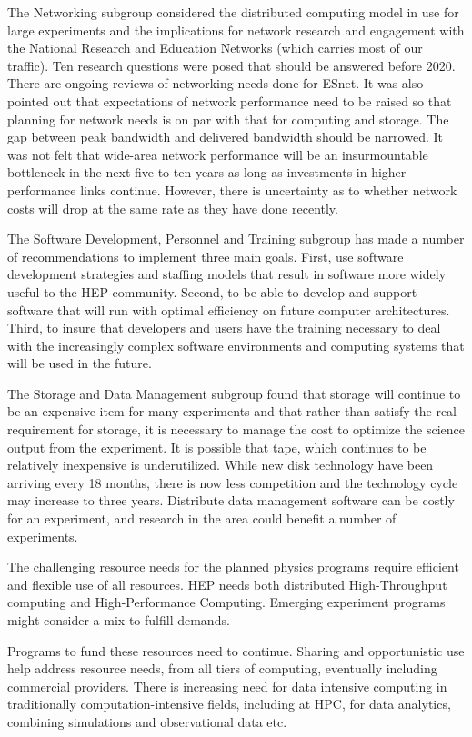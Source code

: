 The Networking subgroup considered the distributed computing model in use for large experiments and the implications for network research and engagement with the National Research and Education Networks (which carries most of our traffic). Ten research questions were posed that should be answered before 2020. There are ongoing reviews of networking needs done for ESnet. It was also pointed out that expectations of network performance need to be raised so that planning for network needs is on par with that for computing and storage.  The gap between peak bandwidth and delivered bandwidth should be narrowed.  It was not felt that wide-area network performance will be an insurmountable bottleneck in the next five to ten years as long as investments in higher performance links continue.  However, there is uncertainty as to whether network costs will drop at the same rate as they have done recently.

The Software Development, Personnel and Training subgroup has made a number of recommendations to implement three main goals.  First, use software development strategies and staffing models that result in software more widely useful to the HEP community.  Second, to be able to develop and support software that will run with optimal efficiency on future computer architectures. Third, to insure that developers and users have the training necessary to deal with the increasingly complex software environments and computing systems that will be used in the future.

The Storage and Data Management subgroup found that storage will continue to be an expensive item for many experiments and that rather than satisfy the real requirement for storage, it is necessary to manage the cost to optimize the science output from the experiment.  It is possible that tape, which continues to be relatively inexpensive is underutilized.  While new disk technology have been arriving every 18 months, there is now less competition and the technology cycle may increase to three years.  Distribute data management software can be costly for an experiment, and research in the area could benefit a number of experiments.

The challenging resource needs for the planned physics programs require efficient and flexible use of all resources. HEP needs both distributed High-Throughput computing and High-Performance Computing. Emerging experiment programs might consider a mix to fulfill demands.

Programs to fund these resources need to continue. Sharing and opportunistic use help address resource needs, from all tiers of computing, eventually including commercial providers. There is increasing need for data intensive computing in traditionally computation-intensive fields, including at HPC, for data analytics, combining simulations and observational data etc. 

